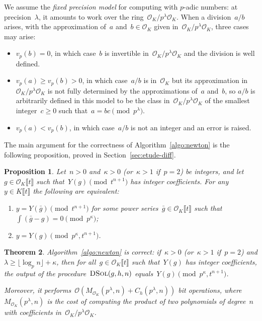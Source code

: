 \documentclass{sig-alternate}
\newtheorem{theo}{Theorem}
\newtheorem{prop}[theo]{Proposition}
\theoremstyle{definition}
\theoremstyle{remark}
\newcommand\cO{\mathcal{O}}
\newcommand\Opt{\cO_K \llbracket t \rrbracket}
\newcommand\Kpt{K\llbracket t \rrbracket}
\newcommand\padic{$p$-adic\xspace}
\def\geq{\geqslant}
\begin{document}
We assume the \emph{fixed precision model} for computing with \padic numbers:
at precision~$\lambda$, it amounts to work over the ring~$\cO_K/p^\lambda\cO_K$.  When a
division~$a/b$ arises, with the approximation of~$a$ and~$b \in \cO_K$ given
in~$\cO_K/p^\lambda\cO_K$, three cases may arise:
\begin{itemize}
  \item $v_p(b) = 0$, in which case~$b$ is invertible in~$\cO_K/p^\lambda\cO_K$ and the division is well defined.
  \item $v_p(a) \geq v_p(b) > 0$, in which case~$a/b$ is in~$\cO_K$ but its approximation in~$\cO_K/p^\lambda\cO_K$ is not fully determined by the approximations of~$a$ and~$b$, so $a/b$ is arbitrarily defined in this model to be the class in~$\cO_K/p^\lambda\cO_K$ of the smallest integer~$c \geq 0$ such that~$a=bc \pmod{p^\lambda}$.\item $v_p(a) < v_p(b)$, in which case~$a/b$ is not an integer and an error is raised.
\end{itemize}

The main argument for the correctness of Algorithm~\ref{algo:newton} is the
following proposition, proved in Section~\ref{sec:etude-diff}.


\begin{prop}
  \label{prop:Ypertub}
Let~$n > 0$ and~$\kappa > 0$ (or~$\kappa > 1$ if~$p=2$) be integers, and let
  $g\in \Opt$ such that~$Y(g) \pmod{t^{n+1}}$ has integer coefficients.
  For any~$y\in\Kpt$ the following are equivalent:
  \begin{enumerate}
\item $y = Y(\bar g) \pmod{t^{n+1}}$ for some power series~$\bar g \in \Opt$ such that~$\int(\bar g - g) = 0 \pmod{p^\kappa}$;
    \item $y = Y(g) \pmod{p^\kappa, t^{n+1}}$.
  \end{enumerate}
\end{prop}


\begin{theo}\label{thm:correctness}
  Algorithm~\ref{algo:newton} is correct:
  if~$\kappa > 0$ (or~$\kappa > 1$ if~$p=2$) and $\lambda \geq \lfloor \log_p n \rfloor + \kappa $, then for all~$g\in \Opt$ such that~$Y(g)$ has integer coefficients,
  the output of the procedure~$\textsc{DSol}(g,h,n)$ equals~$Y(g) \pmod{p^\kappa, t^{n+1}}$.

  Moreover, it performs~$\cO\left(M_{\cO_K}(p^\lambda,n) + C_h(p^\lambda, n) \right)$ bit operations,
  where~$M_{\cO_K}(p^\lambda,n)$ is the cost of computing the product of two polynomials of
degree~$n$ with coefficients in~$\cO_K/p^{\lambda}\cO_K$.
\end{theo}
\end{document}
